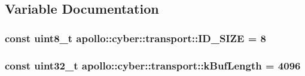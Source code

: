 \subsection{Variable Documentation}
\hypertarget{namespaceapollo_1_1cyber_1_1transport_a5c7448aa493a6ccbc3191720dc7a15ce}{
\subsubsection[{I\-D\-\_\-\-S\-I\-Z\-E}]{\setlength{\rightskip}{0pt plus 5cm}const uint8\-\_\-t apollo\-::cyber\-::transport\-::\-I\-D\-\_\-\-S\-I\-Z\-E = 8}}\label{namespaceapollo_1_1cyber_1_1transport_a5c7448aa493a6ccbc3191720dc7a15ce}
\hypertarget{namespaceapollo_1_1cyber_1_1transport_a12bcc39dba9d39eab46f409750a9e1e8}{
\subsubsection[{k\-Buf\-Length}]{\setlength{\rightskip}{0pt plus 5cm}const uint32\-\_\-t apollo\-::cyber\-::transport\-::k\-Buf\-Length = 4096}}\label{namespaceapollo_1_1cyber_1_1transport_a12bcc39dba9d39eab46f409750a9e1e8}
